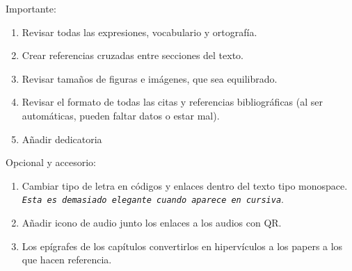 Importante:
  \begin{enumerate}
    \item Revisar todas las expresiones, vocabulario y ortografía.
    \item Crear referencias cruzadas entre secciones del texto.
    \item Revisar tamaños de figuras e imágenes, que sea equilibrado.
    \item Revisar el formato de todas las citas y referencias bibliográficas (al ser automáticas, pueden faltar datos o estar mal).
    \item Añadir dedicatoria %
  \end{enumerate}

  
  Opcional y accesorio:
  \begin{enumerate}
    \item Cambiar tipo de letra en códigos y enlaces dentro del texto tipo monospace. \texttt{\textit{Esta es demasiado elegante cuando aparece en cursiva}}.
    \item Añadir icono de audio junto los enlaces a los audios con QR.
    \item Los epígrafes de los capítulos convertirlos en hipervículos a los papers a los que hacen referencia.
  \end{enumerate}